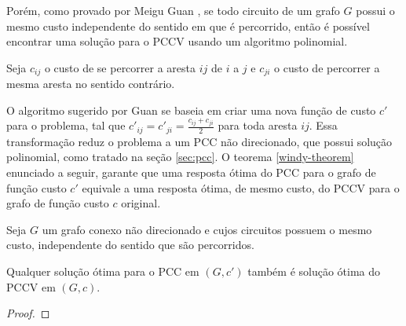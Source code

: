         Porém, como provado por Meigu Guan \cite{guan-windy}, se todo circuito de um grafo $G$ possui o mesmo custo independente do sentido em que é percorrido, então é possível encontrar uma solução para o PCCV usando um algoritmo polinomial.

        Seja $c_{ij}$ o custo de se percorrer a aresta $ij$ de $i$ a $j$ e $c_{ji}$ o custo de percorrer a mesma aresta no sentido contrário.

        O algoritmo sugerido por Guan se baseia em criar uma nova função de custo $c'$ para o problema, tal que $c'_{ij} = c'_{ji} = \frac{c_{ij} + c_{ji}}{2}$ para toda aresta $ij$. 
        Essa transformação reduz o problema a um PCC não direcionado, que possui solução polinomial, como tratado na seção \ref{sec:pcc}.
        O teorema \ref{windy-theorem} enunciado a seguir, garante que uma resposta ótima do PCC para o grafo de função custo $c'$ equivale a uma resposta ótima, de mesmo custo, do PCCV para o grafo de função custo $c$ original.

        \begin{theorem}
            \label{windy-theorem}
            Seja $G$ um grafo conexo não direcionado e cujos circuitos possuem o mesmo custo, independente do sentido que são percorridos. 

            Qualquer solução ótima para o PCC em $(G, c')$ também é solução ótima do PCCV em $(G, c)$.
        \end{theorem}
        \begin{proof} 


        \end{proof}

%
%
